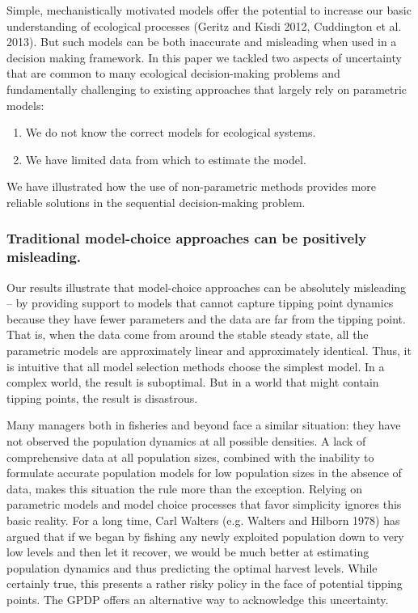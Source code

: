 \documentclass[author-year, 12pt,review]{components/elsarticle} %
\begin{document}
Simple, mechanistically motivated models offer the potential to increase
our basic understanding of ecological processes (Geritz and Kisdi 2012,
Cuddington et al. 2013). But such models can be both inaccurate and
misleading when used in a decision making framework. In this paper we
tackled two aspects of uncertainty that are common to many ecological
decision-making problems and fundamentally challenging to existing
approaches that largely rely on parametric models:

\begin{enumerate}
\def\labelenumi{\arabic{enumi}.}
\itemsep1pt\parskip0pt
\item
  We do not know the correct models for ecological systems.
\item
  We have limited data from which to estimate the model.
\end{enumerate}

We have illustrated how the use of non-parametric methods provides more
reliable solutions in the sequential decision-making problem.

\subsubsection{Traditional model-choice approaches can be positively
misleading.}\label{traditional-model-choice-approaches-can-be-positively-misleading.}

Our results illustrate that model-choice approaches can be absolutely
misleading -- by providing support to models that cannot capture tipping
point dynamics because they have fewer parameters and the data are far
from the tipping point. That is, when the data come from around the
stable steady state, all the parametric models are approximately linear
and approximately identical. Thus, it is intuitive that all model
selection methods choose the simplest model. In a complex world, the
result is suboptimal. But in a world that might contain tipping points,
the result is disastrous.

Many managers both in fisheries and beyond face a similar situation:
they have not observed the population dynamics at all possible
densities. A lack of comprehensive data at all population sizes,
combined with the inability to formulate accurate population models for
low population sizes in the absence of data, makes this situation the
rule more than the exception. Relying on parametric models and model
choice processes that favor simplicity ignores this basic reality. For a
long time, Carl Walters (e.g. Walters and Hilborn 1978) has argued that
if we began by fishing any newly exploited population down to very low
levels and then let it recover, we would be much better at estimating
population dynamics and thus predicting the optimal harvest levels.
While certainly true, this presents a rather risky policy in the face of
potential tipping points. The GPDP offers an alternative way to
acknowledge this uncertainty.
\end{document}
